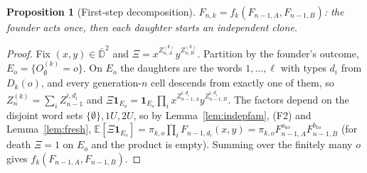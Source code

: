 \documentclass[11pt]{article}
\newtheorem{proposition}[theorem]{Proposition}
\theoremstyle{definition}
\theoremstyle{remark}
\newcommand{\E}{\mathbb{E}}
\begin{document}
\begin{proposition}[First-step decomposition]\label{prop:firststep}
$F_{n,k}=f_k(F_{n-1,A},F_{n-1,B})$: the founder acts once, then each daughter starts an independent clone.
\end{proposition}
\begin{proof}
Fix $(x,y)\in\bar{\mathbb D}^2$ and $\Xi=x^{Z^{(k)}_{n,A}}y^{Z^{(k)}_{n,B}}$. Partition by the founder's outcome, $E_o=\{O^{(k)}_\emptyset=o\}$. On $E_o$ the daughters are the words $1,\dots,\ell$ with types $d_i$ from $D_k(o)$, and every generation-$n$ cell descends from exactly one of them, so $Z^{(k)}_n=\sum_iZ^{i,d_i}_{n-1}$ and $\Xi\mathbf 1_{E_o}=\mathbf 1_{E_o}\prod_ix^{Z^{i,d_i}_{n-1,A}}y^{Z^{i,d_i}_{n-1,B}}$. The factors depend on the disjoint word sets $\{\emptyset\},1U,2U$, so by Lemma~\ref{lem:indepfam}, (F2) and Lemma~\ref{lem:fresh}, $\E[\Xi\mathbf 1_{E_o}]=\pi_{k,o}\prod_iF_{n-1,d_i}(x,y)=\pi_{k,o}F_{n-1,A}^{a_{ko}}F_{n-1,B}^{b_{ko}}$ (for death $\Xi=1$ on $E_o$ and the product is empty). Summing over the finitely many $o$ gives $f_k(F_{n-1,A},F_{n-1,B})$.
\end{proof}
\end{document}
